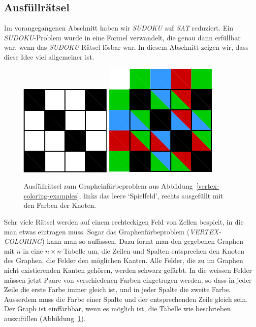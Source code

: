 %
%
% 
\subsection{Ausfüllrätsel}
Im vorangegangenen Abschnitt haben wir \textsl{SUDOKU} auf \textsl{SAT}
reduziert.
Ein \textsl{SUDOKU}-Problem wurde in eine Formel verwandelt, die genau
dann erfüllbar war, wenn das \textsl{SUDOKU}-Rätsel lösbar war.
In diesem Abschnitt zeigen wir, dass diese Idee viel allgemeiner ist.

\begin{figure}
\centering
\includegraphics{images/ausfuell-1.pdf}
\qquad
\qquad
\includegraphics{images/ausfuell-2.pdf}
\caption{Ausfüllrätsel zum Grapheinfärbeproblem aus
Abbildung~\ref{vertex-coloring-examples}, links das leere `Spielfeld',
rechts ausgefüllt mit den Farben der Knoten.
\label{ausfuell:coloring}}
\end{figure}
Sehr viele Rätsel werden auf einem rechteckigen Feld von Zellen
bespielt, in die man etwas eintragen muss.
Sogar das Graphenfärbeproblem (\textsl{VERTEX-COLORING}) kann man
so auffassen.
Dazu formt man den gegebenen Graphen mit $n$ in eine
$n\times n$-Tabelle um, die Zeilen und Spalten entsprechen den Knoten
des Graphen, die Felder den möglichen Kanten.
Alle Felder, die zu im Graphen nicht existierenden Kanten gehören,
werden schwarz gefärbt.
In die weissen Felder müssen jetzt Paare von verschiedenen Farben
eingetragen werden, so dass in jeder Zeile die erste Farbe immer
gleich ist, und in jeder Spalte die zweite Farbe.
Ausserdem muss die Farbe einer Spalte und der entsprechenden Zeile
gleich sein.
Der Graph ist einffärbbar, wenn es möglich ist, die Tabelle wie
beschrieben auszufüllen (Abbildung~\ref{ausfuell:coloring}).

